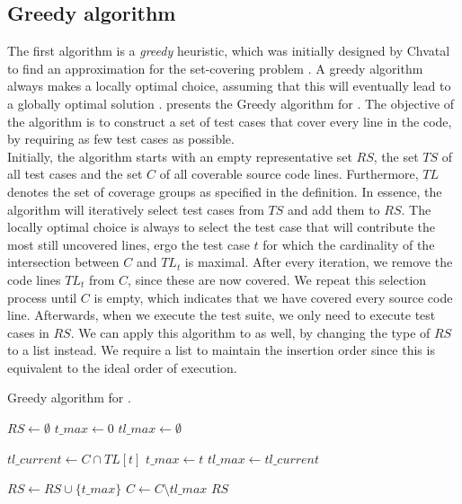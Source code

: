 
\subsection{Greedy algorithm}\label{ssec:alg-greedy}
The first algorithm is a \emph{greedy} heuristic, which was initially designed by Chvatal to find an approximation for the set-covering problem \cite{evaluationoftestsuiteminimization}. A greedy algorithm always makes a locally optimal choice, assuming that this will eventually lead to a globally optimal solution \cite{10.5555/1614191}.  presents the Greedy algorithm for \tsm{}. The objective of the algorithm is to construct a set of test cases that cover every line in the code, by requiring as few test cases as possible.\\

\noindent Initially, the algorithm starts with an empty representative set $RS$, the set $TS$ of all test cases and the set $C$ of all coverable source code lines. Furthermore, $TL$ denotes the set of coverage groups as specified in the definition. In essence, the algorithm will iteratively select test cases from $TS$ and add them to $RS$. The locally optimal choice is always to select the test case that will contribute the most still uncovered lines, ergo the test case $t$ for which the cardinality of the intersection between $C$ and $TL_t$ is maximal. After every iteration, we remove the code lines $TL_t$ from $C$, since these are now covered. We repeat this selection process until $C$ is empty, which indicates that we have covered every source code line. Afterwards, when we execute the test suite, we only need to execute test cases in $RS$. We can apply this algorithm to \tcp{} as well, by changing the type of $RS$ to a list instead. We require a list to maintain the insertion order since this is equivalent to the ideal order of execution.

\begin{algorithm}[h!]
\caption{Greedy algorithm for \tsm{}.}
\label{alg:tsm-greedy}
\begin{algorithmic}[1]
		\State $RS \gets \emptyset$
			\State $t\_max \gets 0$
			\State $tl\_max \gets \emptyset$
			
				\State $tl\_current \gets C \cap TL[t]$
					\State $t\_max \gets t$
					\State $tl\_max \gets tl\_current$
				\EndIf
			\EndFor
			
			\State $RS \gets RS \cup \{t\_max\}$
			\State $C \gets C \setminus tl\_max$
		\EndWhile
		\State \Return $RS$
	\EndProcedure
\end{algorithmic}
\end{algorithm}
